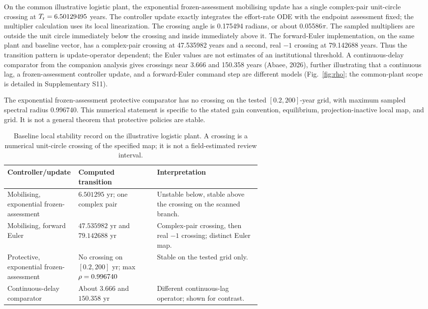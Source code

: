 On the common illustrative logistic plant, the exponential frozen-assessment mobilising update has a single complex-pair unit-circle crossing at \(T_{\mathrm r}=6.50129495\) years. The controller update exactly integrates the effort-rate ODE with the endpoint assessment fixed; the multiplier calculation uses its local linearization. The crossing angle is 0.175494 radians, or about 0.05586\(\pi\). The sampled multipliers are outside the unit circle immediately below the crossing and inside immediately above it. The forward-Euler implementation, on the same plant and baseline vector, has a complex-pair crossing at 47.535982 years and a second, real \(-1\) crossing at 79.142688 years. Thus the transition pattern is update-operator dependent; the Euler values are not estimates of an institutional threshold. A continuous-delay comparator from the companion analysis gives crossings near 3.666 and 150.358 years (Abaee, 2026), further illustrating that a continuous lag, a frozen-assessment controller update, and a forward-Euler command step are different models (Fig.~\ref{fig:rho}; the common-plant scope is detailed in Supplementary S11).

The exponential frozen-assessment protective comparator has no crossing on the tested \([0.2,200]\)-year grid, with maximum sampled spectral radius 0.996740. This numerical statement is specific to the stated gain convention, equilibrium, projection-inactive local map, and grid. It is not a general theorem that protective policies are stable.

\begin{table}[htbp]
\centering\small
\caption{Baseline local stability record on the illustrative logistic plant. A crossing is a numerical unit-circle crossing of the specified map; it is not a field-estimated review interval.}
\label{tab:crossings}
\begin{tabularx}{\linewidth}{@{}p{0.29\linewidth}p{0.31\linewidth}X@{}}
\toprule
Controller/update & Computed transition & Interpretation \\
\midrule
Mobilising, exponential frozen-assessment & \(6.501295\) yr; one complex pair & Unstable below, stable above the crossing on the scanned branch. \\
Mobilising, forward Euler & \(47.535982\) yr and \(79.142688\) yr & Complex-pair crossing, then real \(-1\) crossing; distinct Euler map. \\
Protective, exponential frozen-assessment & No crossing on \([0.2,200]\) yr; max \(\rho=0.996740\) & Stable on the tested grid only. \\
Continuous-delay comparator & About \(3.666\) and \(150.358\) yr & Different continuous-lag operator; shown for contrast. \\
\bottomrule
\end{tabularx}
\end{table}

